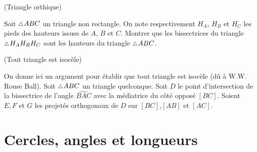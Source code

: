 \documentclass[a4paper,11pt,reqno]{amsart}
\begin{document}
\begin{exo}[.7] (Triangle orthique)

  Soit $\tri ABC$ un triangle non rectangle. On note respectivement $H_A$, $H_B$ et $H_C$ les pieds des hauteurs issues de $A$, $B$ et $C$. Montrer que les bissectrices du triangle $\tri H_AH_BH_C$ sont les hauteurs du triangle $\tri ABC$.
\end{exo}

\begin{exo} (Tout triangle est isocèle)

  On donne ici un argument pour établir que tout triangle est isocèle (dû à W.W. Rouse Ball).
  Soit $\tri ABC$ un triangle quelconque. Soit $D$ le point d'intersection de la bissectrice de l'angle $\widehat{BAC}$ avec la médiatrice du côté opposé $[BC]$. Soient $E,F$ et $G$ les projetés orthogonaux de $D$ sur $[BC]$,$[AB]$ et $[AC]$.
\end{exo}

\section{Cercles, angles et longueurs}
\end{document}
